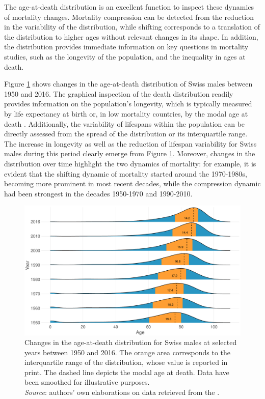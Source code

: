 \documentclass[11pt, a4paper]{article}
\begin{document}
The age-at-death distribution is an excellent function to inspect these dynamics of mortality changes. Mortality compression can be detected from the reduction in the variability of the distribution, while shifting corresponds to a translation of the distribution to higher ages without relevant changes in its shape. In addition, the distribution provides immediate information on key questions in mortality studies, such as the longevity of the population, and the inequality in ages at death.

Figure \ref{Fig:Intro} shows changes in the age-at-death distribution of Swiss males between 1950 and 2016. The graphical inspection of the death distribution readily provides information on the population's longevity, which is typically measured by life expectancy at birth or, in low mortality countries, by the modal age at death \citep{kannisto2001mode,horiuchi2013modal}. Additionally, the variability of lifespans within the population can be directly assessed from the spread of the distribution or its interquartile range. The increase in longevity as well as the reduction of lifespan variability for Swiss males during this period clearly emerge from Figure \ref{Fig:Intro}. Moreover, changes in the distribution over time highlight the two dynamics of mortality: for example, it is evident that the shifting dynamic of mortality started around the 1970-1980s, becoming more prominent in most recent decades, while the compression dynamic had been strongest in the decades 1950-1970 and 1990-2010.
  
\begin{figure}[t]
	\begin{center}
		\includegraphics[scale=0.55]{./Figures/F1.pdf}
		\caption{Changes in the age-at-death distribution for Swiss males at selected years between 1950 and 2016. The orange area corresponds to the interquartile range of the distribution, whose value is reported in print. The dashed line depicts the modal age at death. Data have been smoothed for illustrative purposes.\\\footnotesize{\textit{Source}: authors' own elaborations on data retrieved from the \cite{HMD}.} \label{Fig:Intro}}		
	\end{center}
\end{figure}
\end{document}
